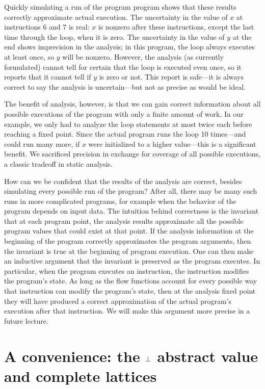 \documentclass[11pt]{article}
\begin{document}
Quickly simulating a run of the program program shows that these results
correctly approximate actual execution.  The uncertainty in the value of $x$ at
instructions 6 and 7 is real: $x$ is nonzero after these instructions, except
the last time through the loop, when it is zero.  The uncertainty in the value
of $y$ at the end shows imprecision in the analysis; in this program, the loop
always executes at least once, so $y$ will be nonzero.  However, the analysis
(as currently formulated) cannot tell for certain that the loop is executed even
once, so it reports that it cannot tell if $y$ is zero or not.  This report is
safe---it is always correct to say the analysis is uncertain---but not as
precise as would be ideal.

The benefit of analysis, however, is that we can gain correct information about
all possible executions of the program with only a finite amount of work.  In
our example, we only had to analyze the loop statements at most twice each
before reaching a fixed point.  Since the actual program runs the loop 10
times---and could run many more, if $x$ were initialized to a higher
value---this is a significant benefit.  We sacrificed precision in exchange for
coverage of all possible executions, a classic tradeoff in static analysis.

How can we be confident that the results of the analysis are correct, besides
simulating every possible run of the program?  After all, there may be many such
runs in more complicated programs, for example when the behavior of the program
depends on input data.  The intuition behind correctness is the invariant that
at each program point, the analysis results approximate all the possible program
values that could exist at that point.  If the analysis information at the
beginning of the program correctly approximates the program arguments, then the
invariant is true at the beginning of program execution.  One can then make an
inductive argument that the invariant is preserved as the program executes.  In
particular, when the program executes an instruction, the instruction modifies
the program's state.  As long as the flow functions account for every possible
way that instruction can modify the program's state, then at the analysis fixed
point they will have produced a correct approximation of the actual program's
execution after that instruction.  We will make this argument more precise in a
future lecture.


\section{A convenience: the $\bot$ abstract value and complete lattices}
\end{document}
